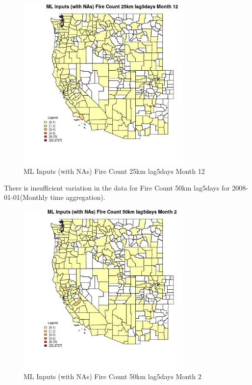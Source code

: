 \begin{figure} 
\centering  
\includegraphics[width=0.77\textwidth]{Code_Outputs/Report_ML_input_PM25_Step4_part_f_de_duplicated_aveswNAs_CountyFire_Count_25km_lag5daysmedianMonth12.jpg} 
\caption{\label{fig:Report_ML_input_PM25_Step4_part_f_de_duplicated_aveswNAsCountyFire_Count_25km_lag5daysmedianMonth12}ML Inputs (with NAs) Fire Count 25km lag5days Month 12} 
\end{figure} 
 

There is insufficient variation in the data for Fire Count 50km lag5days for 2008-01-01(Monthly time aggregation). 
 

\begin{figure} 
\centering  
\includegraphics[width=0.77\textwidth]{Code_Outputs/Report_ML_input_PM25_Step4_part_f_de_duplicated_aveswNAs_CountyFire_Count_50km_lag5daysmedianMonth2.jpg} 
\caption{\label{fig:Report_ML_input_PM25_Step4_part_f_de_duplicated_aveswNAsCountyFire_Count_50km_lag5daysmedianMonth2}ML Inputs (with NAs) Fire Count 50km lag5days Month 2} 
\end{figure} 
 

